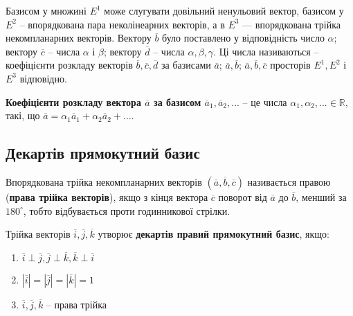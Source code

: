 \begin{remark}
    Базисом у множині $E^1$ може слугувати довільний ненульовий
    вектор, базисом у $E^2$ – впорядкована пара неколінеарних векторів, а в $E^3$ ---
    впорядкована трійка некомпланарних векторів. Вектору $\overline{b}$ було поставлено у
    відповідність число $\alpha$; вектору $\overline{c}$ – числа $\alpha$ і $\beta$; вектору 
    $\overline{d}$ – числа $\alpha, \beta, \gamma$. 
    Ці числа називаються -- коефіцієнти розкладу векторів $\overline{b}, \overline{c}, \overline{d}$ за базисами
    $\overline{a}$; $\overline{a}, \overline{b}$; $\overline{a}, \overline{b}, \overline{c}$ просторів $E^1, E^2$ і $E^3$ відповідно.
\end{remark}

\begin{definition}
    \textbf{Коефіцієнти розкладу вектора $\overline{a}$ за базисом $\overline{a}_1, \overline{a}_2, ...$}
    -- це числа $\alpha_1, \alpha_2, ... \in \mathbb{R}$, такі, що
    $\overline{a} = \alpha_1\overline{a}_1 + \alpha_2\overline{a}_2 + ...$.
\end{definition}

\subsection{Декартів прямокутний базис}

\begin{definition}
    Впорядкована трійка некомпланарних векторів $(\overline{a}, \overline{b}, \overline{c})$ називається правою (\textbf{права трійка векторів}),
    якщо з кінця вектора $\overline{c}$ поворот від $\overline{a}$ до $\overline{b}$, менший за $180^{\circ}$, тобто відбувається проти
    годинникової стрілки.
\end{definition}

\begin{definition}
    Трійка векторів $\overline{i}, \overline{j}, \overline{k}$ утворює \textbf{декартів правий прямокутний базис},
    якщо: 
    \begin{enumerate}
        \item $\overline{i} \perp \overline{j}, \overline{j} \perp \overline{k}, \overline{k} \perp \overline{i}$
        \item $|\overline{i}| = |\overline{j}| = |\overline{k}| = 1$
        \item $\overline{i}, \overline{j}, \overline{k}$ -- права трійка
    \end{enumerate}
\end{definition}

